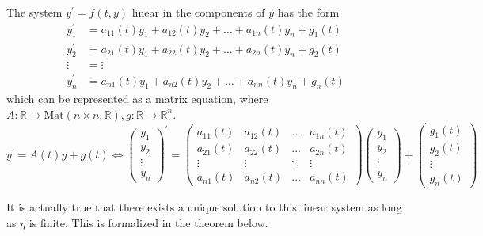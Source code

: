 \documentclass{article}
\newcounter{theorem}[section]
\newcounter{definition}[section]
\begin{document}
    \begin{definition}
      \label{def:linear-systems-of-deqs}
    The system $y^\prime = f(t, y)$ linear in the components of $y$ has the form 
    \begin{align*}
        y_1^\prime & = a_{11}(t) y_1 + a_{12}(t) y_2 + \ldots + a_{1n}(t) y_n + g_1 (t) \\
        y_2^\prime & = a_{21}(t) y_1 + a_{22}(t) y_2 + \ldots + a_{2n}(t) y_n + g_2 (t) \\
        \vdots & = \vdots \\
        y_n^\prime & = a_{n1}(t) y_1 + a_{n2}(t) y_2 + \ldots + a_{nn}(t) y_n + g_n (t)
    \end{align*}
    which can be represented as a matrix equation, where $A: \mathbb{R} \to \text{Mat}(n \times n, \mathbb{R}), g: \mathbb{R} \to \mathbb{R}^n$. 
    \begin{equation}
      y^\prime = A(t) y + g(t) \iff \begin{pmatrix}
          y_1 \\ y_2 \\ \vdots \\ y_n
          \end{pmatrix}^\prime = \begin{pmatrix}
          a_{11}(t) & a_{12} (t) & \ldots & a_{1n}(t) \\
          a_{21}(t) & a_{22} (t) & \ldots & a_{2n}(t) \\
          \vdots & \vdots & \ddots & \vdots \\
          a_{n1}(t) & a_{n2} (t) & \ldots & a_{nn}(t)
          \end{pmatrix} \begin{pmatrix}
          y_1 \\ y_2 \\ \vdots \\ y_n
          \end{pmatrix} + \begin{pmatrix}
          g_1 (t) \\ g_2 (t) \\ \vdots \\ g_n (t)
          \end{pmatrix}
    \end{equation}
    \end{definition}

    It is actually true that there exists a unique solution to this linear system as long as $\eta$ is finite. This is formalized in the theorem below. 
\end{document}
